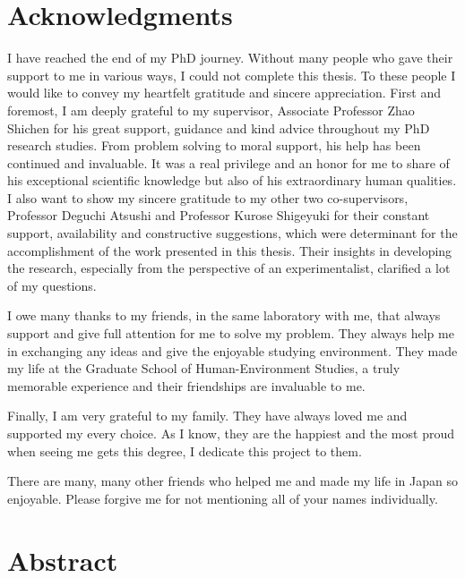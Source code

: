 \documentclass[12pt, twoside, a4paper]{book} %
\begin{document}
\chapter{Acknowledgments}
\fontsize{13pt}{16.9pt} %
\selectfont
I have reached the end of my PhD journey. Without many people who gave their support to me in various ways, I could not complete this thesis. To these people I would like to convey my heartfelt gratitude and sincere appreciation. 
%
First and foremost, I am deeply grateful to my supervisor, Associate Professor Zhao Shichen for his great support, guidance and kind advice throughout my PhD research studies. From problem solving to moral support, his help has been continued and invaluable. It was a real privilege and an honor for me to share of his exceptional scientific knowledge but also of his extraordinary human qualities.
I also want to show my sincere gratitude to my other two co-supervisors, Professor Deguchi Atsushi and Professor Kurose Shigeyuki for their constant support, availability and constructive suggestions, which were determinant for the accomplishment of the work presented in this thesis. Their insights in developing the research, especially from the perspective of an experimentalist, clarified a lot of my questions.

%
I owe many thanks to my friends, in the same laboratory with me, that always support and give full attention for me to solve my problem. They always help me in exchanging any ideas and give the enjoyable studying environment. They made my life at the Graduate School of Human-Environment Studies, a truly memorable experience and their friendships are invaluable to me.

%
Finally, I am very grateful to my family. They have always loved me and supported my every choice. As I know, they are the happiest and the most proud when seeing me gets this degree, I dedicate this project to them. 

%
There are many, many other friends who helped me and made my life in Japan so enjoyable. Please forgive me for not mentioning all of your names individually.

\chapter{Abstract}
\end{document}
